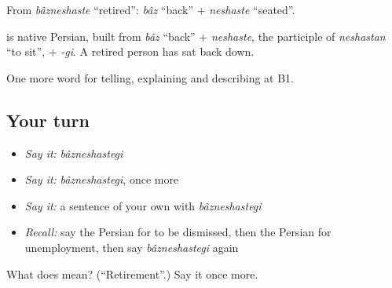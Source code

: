 From \emph{bâzneshaste} \textquotedblleft{}retired\textquotedblright{}: \emph{bâz} \textquotedblleft{}back\textquotedblright{} + \emph{neshaste} \textquotedblleft{}seated\textquotedblright{}.

\begin{cousinweb}
\textbf{} is native Persian, built from \emph{bâz} \textquotedblleft{}back\textquotedblright{} + \emph{neshaste}, the participle of \emph{neshastan} \textquotedblleft{}to sit\textquotedblright{}, + \emph{-gi}. A retired person has sat back down.
\end{cousinweb}

\begin{grammarlens}[title={What you've built}]
One more word for telling, explaining and describing at B1.
\end{grammarlens}

\subsection*{Your turn}
\begin{itemize}
\raggedright
  \item \emph{Say it:} \emph{bâzneshastegi}
  \item \emph{Say it:} \emph{bâzneshastegi}, once more
  \item \emph{Say it:} a sentence of your own with \emph{bâzneshastegi}
  \item \emph{Recall:} say the Persian for to be dismissed, then the Persian for unemployment, then say \emph{bâzneshastegi} again
\end{itemize}

\begin{tcolorbox}[breakable,colback=teal!4,colframe=teal!35!black,title={Before you move on}]
What does  mean? (\textquotedblleft{}Retirement\textquotedblright{}.) Say it once more.
\end{tcolorbox}
